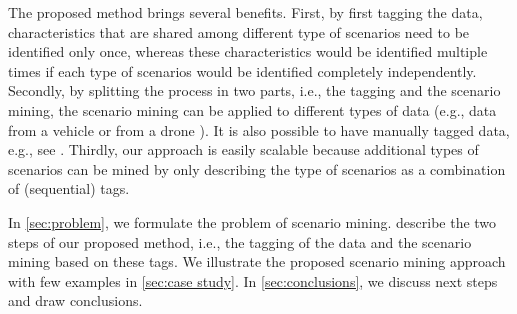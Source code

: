 The proposed method brings several benefits. 
First, by first tagging the data, characteristics that are shared among different type of scenarios need to be identified only once, whereas these characteristics would be identified multiple times if each type of scenarios would be identified completely independently.
Secondly, by splitting the process in two parts, i.e., the tagging and the scenario mining, the scenario mining can be applied to different types of data (e.g., data from a vehicle \autocite{paardekooper2019dataset6000km} or from a drone \autocite{krajewski2018highD}). 
It is also possible to have manually tagged data, e.g., see \autocite{fontana2018action}. 
Thirdly, our approach is easily scalable because additional types of scenarios can be mined by only describing the type of scenarios as a combination of (sequential) tags.

In \cref{sec:problem}, we formulate the problem of scenario mining.  describe the two steps of our proposed method, i.e., the tagging of the data and the scenario mining based on these tags. 
We illustrate the proposed scenario mining approach with few examples in \cref{sec:case study}. 
In \cref{sec:conclusions}, we discuss next steps and draw conclusions.

\cenda

